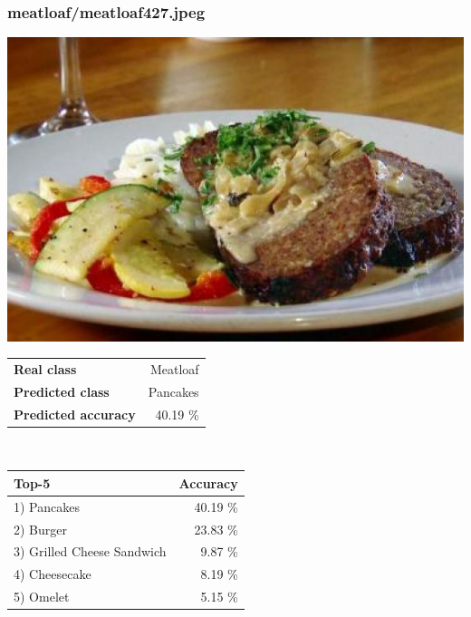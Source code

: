 \subsubsection{meatloaf/meatloaf427.jpeg}

\begin{minipage}[t]{0.4\textwidth}
	\vspace{0pt}
	\includegraphics[width=\linewidth]{images/evaluation-images/meatloaf/meatloaf427.jpeg}
\end{minipage}
\hfill
\begin{minipage}[t]{0.5\textwidth}
	\vspace{0pt}\raggedright
	\begin{tabularx}{\textwidth}{X r}
		\small \textbf{Real class} & \small Meatloaf\\
		\small \textbf{Predicted class} & \small Pancakes\\
		\small \textbf{Predicted accuracy} & \small 40.19 \%
    \end{tabularx}\\
    
    \vspace{6pt}
	\begin{tabularx}{\textwidth}{X r}
        \small \textbf{Top-5} & \small \textbf{Accuracy} \\
        \hline
		\small 1) Pancakes & \small 40.19 \%\\\small 2) Burger & \small 23.83 \%\\\small 3) Grilled Cheese Sandwich & \small 9.87 \%\\\small 4) Cheesecake & \small 8.19 \%\\\small 5) Omelet & \small 5.15 \%
    \end{tabularx}
\end{minipage}
    
